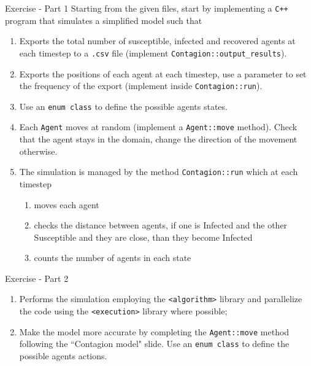 \documentclass[10pt,aspectratio=169]{beamer}
\begin{document}
\begin{frame}{Exercise - Part 1}
Starting from the given files, start by implementing a \texttt{C++} program that simulates a simplified model such that
    \begin{enumerate}
        \item Exports the total number of susceptible, infected and recovered agents at each timestep to a \texttt{.csv} file (implement \texttt{Contagion::output\_results}).
        \item Exports the positions of each agent at each timestep, use a parameter to set the frequency of the export (implement inside \texttt{Contagion::run}).
        \item Use an \texttt{enum class} to define the possible agents states.
        \item Each \texttt{Agent} moves at random (implement a \texttt{Agent::move} method). Check that the agent stays in the domain, change the direction of the movement otherwise.
        \item The simulation is managed by the method \texttt{Contagion::run} which at each timestep
        \begin{enumerate}
            \item moves each agent
            \item checks the distance between agents, if one is Infected and the other Susceptible and they are close, than they become Infected
            \item counts the number of agents in each state
        \end{enumerate}
    \end{enumerate}
\end{frame}

\begin{frame}{Exercise - Part 2}
    \begin{enumerate}
        \item Performs the simulation employing the \texttt{<algorithm>} library and parallelize the code using the \texttt{<execution>} library where possible;
        \item Make the model more accurate by completing the \texttt{Agent::move} method following the ``Contagion model" slide. Use an \texttt{enum class} to define the possible agents actions.
    \end{enumerate}
\end{frame}
\end{document}
